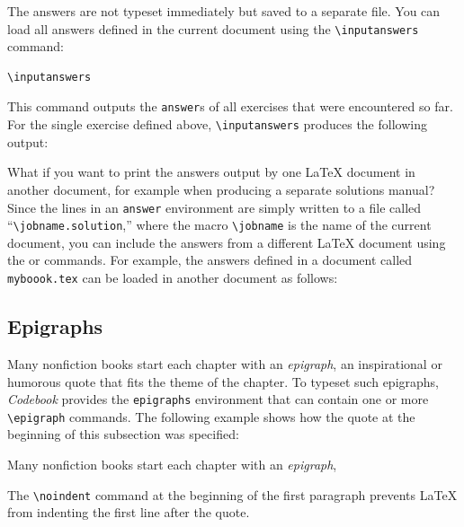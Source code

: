 \documentclass[minted]{codebook}
\begin{document}
The answers are not typeset immediately but saved to a separate file.
You can load all answers defined in the current document using the \verb|\inputanswers| command:
\begin{lst*}{}
\begin{verbatim}
\inputanswers
\end{verbatim}
\end{lst*}
This command outputs the \verb|answer|s of all exercises that were encountered so far.
For the single exercise defined above, \verb|\inputanswers| produces the following output:

What if you want to print the answers output by one \LaTeX{} document in another document, for example when producing a separate solutions manual?
Since the lines in an \verb|answer| environment are simply written to a file called ``\verb|\jobname.solution|,'' where the macro \verb|\jobname| is the name of the current document, you can include the answers from a different \LaTeX{} document using the \verb|| or \verb|| commands.
For example, the answers defined in a document called \verb|myboook.tex| can be loaded in another document as follows:
\begin{texcode}

\end{texcode}


\subsection{Epigraphs}


\chapterindent Many nonfiction books start each chapter with an \emph{epigraph},
an inspirational or humorous quote that fits the theme of the chapter.
To typeset such epigraphs, \emph{Codebook} provides the \verb|epigraphs| environment that can contain one or more \verb|\epigraph| commands.
The following example shows how the quote at the beginning of this subsection was specified:
\begin{texcode}
\noindent Many nonfiction books start each chapter with an \emph{epigraph},
\end{texcode}
The \verb|\noindent| command at the beginning of the first paragraph prevents \LaTeX{} from indenting the first line after the quote.
\end{document}
